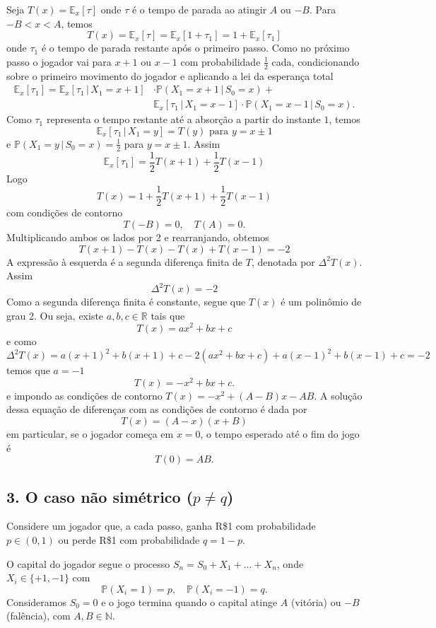 \documentclass{article}
\begin{document}
Seja \( T(x) = \mathbb{E}_x[\tau] \) onde $\tau$ é o tempo de parada ao
atingir $A$ ou $-B$.  Para \( -B < x < A \), temos
\[
  T(x) =
\mathbb{E}_x[\tau] = \mathbb{E}_x[1 + \tau_1] = 1 + \mathbb{E}_x[\tau_1]
\]
onde $\tau_1$ é o tempo de parada restante após o primeiro passo. Como no
próximo passo o jogador vai para \( x+1 \) ou \( x-1 \) com
probabilidade \( \frac{1}{2} \) cada, condicionando sobre o primeiro movimento do jogador e aplicando a lei da esperança total
\begin{align*}
  \mathbb{E}_x[\tau_1] =
  \mathbb{E}_x[\tau_1 \,|\, X_1 = x+1]&\cdot  \mathbb{P}(X_1 = x+1\,|\, S_0=x ) + \\
 & \mathbb{E}_x[\tau_1 \,|\, X_1 = x-1]\cdot  \mathbb{P}(X_1 = x-1\,|\, S_0=x ) .
\end{align*}
Como $\tau_1$ representa o tempo restante até a absorção a partir do
instante $1$, temos
\[
  \mathbb{E}_x[\tau_1 \,|\, X_1 = y] =T(y) \text{ para } y=x\pm 1
\]
e $ \mathbb{P}(X_1 = y \,|\, S_0=x ) = \tfrac 12$ para $y=x\pm 1$. Assim
\[
\mathbb{E}_x[\tau_1] = \frac{1}{2}T(x+1) + \frac{1}{2}T(x-1)
\]
Logo
\[
T(x) = 1 + \frac{1}{2}T(x+1) + \frac{1}{2}T(x-1)
\]
com condições de contorno
\[
T(-B) = 0, \quad T(A) = 0.
\]
Multiplicando ambos os lados por 2 e rearranjando, obtemos
\[
T(x+1) - T(x) - T(x) + T(x-1) = - 2
\]
A expressão à esquerda é a segunda diferença finita de \( T \),
denotada por \( \Delta^2 T(x) \). Assim
\[
\Delta^2 T(x) = -2
\]
Como a segunda diferença finita é constante, segue que \( T(x) \) é um
polinômio de grau 2. Ou seja, existe \( a, b, c \in \mathbb{R} \) tais
que
\[
T(x) = ax^2 + bx + c
\]
e como
\( \Delta^2 T(x) = a(x+1)^2 + b(x+1) + c - 2(ax^2 + bx + c) + a(x-1)^2
+ b(x-1) + c = -2\) temos que  \( a = -1 \)
\[
T(x) = -x^2 + bx + c.
\]
e impondo as condições de contorno \( T(x) = -x^2 + (A-B)x - AB \).  A
solução dessa equação de diferenças com as condições de contorno é dada
por
\[
T(x) = (A - x)(x + B)
\]
em particular, se o jogador começa em \( x = 0 \), o tempo esperado até o fim do jogo é
\[
T(0) = AB.
\]

\subsection*{3. O caso não simétrico (\( p \neq q \)) }


Considere um jogador que, a cada passo, ganha R\$1 com probabilidade \( p \in (0,1) \) ou perde R\$1 com probabilidade \( q = 1 - p \).

O capital do jogador segue o processo \( S_n = S_0 + X_1 + \dots + X_n \), onde \( X_i \in \{ +1, -1 \} \) com
\[
\mathbb{P}(X_i = 1) = p, \quad \mathbb{P}(X_i = -1) = q.
\]
Consideramos $S_0=0$ e o jogo termina quando o capital atinge \( A \)
(vitória) ou \( -B \) (falência), com \( A, B \in \mathbb{N} \).
\end{document}
